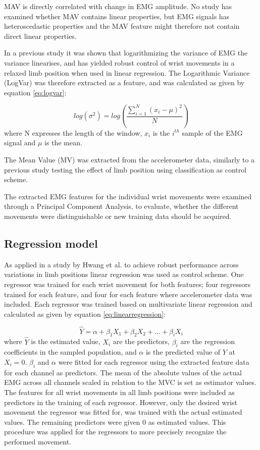 \documentclass[a4paper, 10pt, conference]{ieeeconf}      %
\begin{document}
MAV is directly correlated with change in EMG amplitude. No study has examined whether MAV contains linear properties, but EMG signals has heteroscedastic properties \cite{rasool2012} and the MAV feature might therefore not contain direct linear properties.

In a previous study \cite{hahne2014} it was shown that logarithmizing the variance of EMG the variance linearises, and has yielded robust control of wrist movements in a relaxed limb position when used in linear regression. The Logarithmic Variance (LogVar) was therefore extracted as a feature, and was calculated as given by equation \ref{eq:logvar}:

\begin{equation} \label{eq:logvar}
log(\sigma^2) = log(\frac{\sum\limits_{i=1}^N(x_i - \mu)^2}{N})
\end{equation}
where N expresses the length of the window, $x_i$ is the $i^{th}$ sample of the EMG signal and $\mu$ is the mean.

The Mean Value (MV) was extracted from the accelerometer data, similarly to a previous study \cite{Krasoulis2015} testing the effect of limb position using classification as control scheme. 

The extracted EMG features for the individual wrist movements were examined through a Principal Component Analysis, to evaluate, whether the different movements were distinguishable or new training data should be acquired.

\subsection{Regression model}
As applied in a study by Hwang et al. \cite{hwang2017} to achieve robust performance across variations in limb positions linear regression was used as control scheme. One regressor was trained for each wrist movement for both features; four regressors trained for each feature, and four for each feature where accelerometer data was included. Each regressor was trained based on multivariate linear regression and calculated as given by equation \ref{eq:linearregression}:

\begin{equation} \label{eq:linearregression}
\hat{Y} = \alpha + \beta_1 X_{1} + \beta_2 X_{2} + ... + \beta_i X_{i}
\end{equation}
where $\hat{Y}$ is the estimated value, $X_i$ are the predictors, $\beta_i$ are the regression coefficients in the sampled population, and $\alpha$ is the predicted value of $Y$ at $X_{i} = 0$. $\beta_i$ and $\alpha$ were fitted for each regressor using the extracted feature data for each channel as predictors. The mean of the absolute values of the actual EMG across all channels scaled in relation to the MVC is set as estimator values. The features for all wrist movements in all limb positions were included as predictors in the training of each regressor. However, only the desired wrist movement the regressor was fitted for, was trained with the actual estimated values. The remaining predictors were given 0 as estimated values. This procedure was applied for the regressors to more precisely recognize the performed movement.
\end{document}
